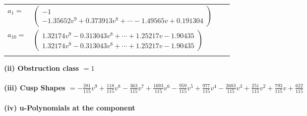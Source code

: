 \documentclass[1p]{elsarticle_modified}
\theoremstyle{definition}
\begin{document}
\begin{tabular}{m{7pt} m{180pt} m{7pt} m{180pt} }
\flushright $a_{1}=$&$\begin{pmatrix}-1\\-1.35652 v^{9}+0.373913 v^{8}+\cdots-1.49565 v+0.191304\end{pmatrix}$ \\
\flushright $a_{10}=$&$\begin{pmatrix}1.32174 v^{9}-0.313043 v^{8}+\cdots+1.25217 v-1.90435\\1.32174 v^{9}-0.313043 v^{8}+\cdots+1.25217 v-1.90435\end{pmatrix}$\\&\end{tabular}
\flushleft \textbf{(ii) Obstruction class $= 1$}\\~\\
\flushleft \textbf{(iii) Cusp Shapes $= -\frac{281}{115} v^9+\frac{118}{115} v^8-\frac{363}{115} v^7+\frac{1693}{115} v^6-\frac{959}{115} v^5+\frac{977}{115} v^4-\frac{2683}{115} v^3+\frac{251}{115} v^2+\frac{793}{115} v+\frac{622}{115}$}\\~\\
\newpage\renewcommand{\arraystretch}{1}
\flushleft \textbf{(iv) u-Polynomials at the component}\newline \\
\end{document}
